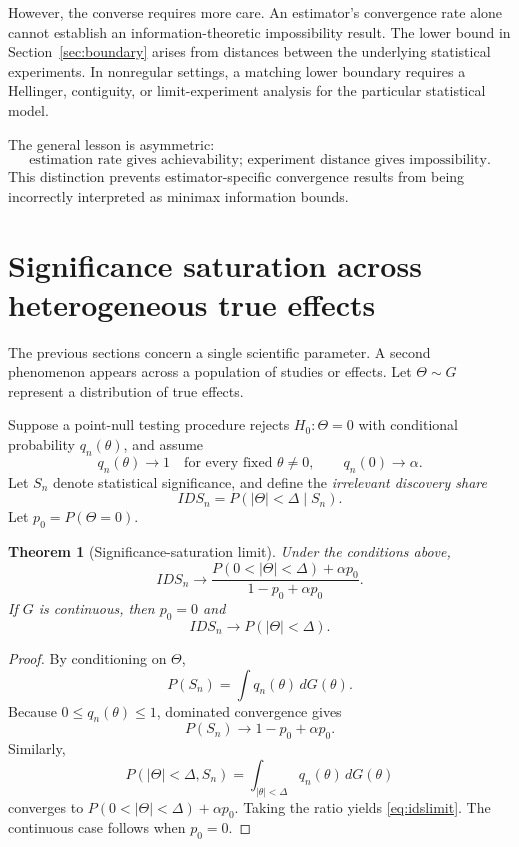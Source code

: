 \documentclass[11pt]{article}
\newtheorem{theorem}{Theorem}
\theoremstyle{remark}
\begin{document}
However, the converse requires more care. An estimator's convergence rate alone cannot establish an information-theoretic impossibility result. The lower bound in Section~\ref{sec:boundary} arises from distances between the underlying statistical experiments. In nonregular settings, a matching lower boundary requires a Hellinger, contiguity, or limit-experiment analysis for the particular statistical model.

The general lesson is asymmetric:
\[
\text{estimation rate gives achievability; experiment distance gives impossibility.}
\]
This distinction prevents estimator-specific convergence results from being incorrectly interpreted as minimax information bounds.

\section{Significance saturation across heterogeneous true effects}

The previous sections concern a single scientific parameter. A second phenomenon appears across a population of studies or effects. Let $\Theta\sim G$ represent a distribution of true effects.

Suppose a point-null testing procedure rejects $H_0:\Theta=0$ with conditional probability $q_n(\theta)$, and assume
\[
q_n(\theta)\to1\quad\text{for every fixed }\theta\ne0,
\qquad
q_n(0)\to\alpha.
\]
Let $S_n$ denote statistical significance, and define the \emph{irrelevant discovery share}
\begin{equation}
IDS_n=P(|\Theta|<\Delta\mid S_n).
\label{eq:ids}
\end{equation}
Let $p_0=P(\Theta=0)$.

\begin{theorem}[Significance-saturation limit]
\label{thm:ids}
Under the conditions above,
\begin{equation}
IDS_n\longrightarrow
\frac{P(0<|\Theta|<\Delta)+\alpha p_0}
{1-p_0+\alpha p_0}.
\label{eq:idslimit}
\end{equation}
If $G$ is continuous, then $p_0=0$ and
\[
IDS_n\longrightarrow P(|\Theta|<\Delta).
\]
\end{theorem}

\begin{proof}
By conditioning on $\Theta$,
\[
P(S_n)=\int q_n(\theta)\,dG(\theta).
\]
Because $0\le q_n(\theta)\le1$, dominated convergence gives
\[
P(S_n)\to1-p_0+\alpha p_0.
\]
Similarly,
\[
P(|\Theta|<\Delta,S_n)
=
\int_{|\theta|<\Delta}q_n(\theta)\,dG(\theta)
\]
converges to $P(0<|\Theta|<\Delta)+\alpha p_0$. Taking the ratio yields \eqref{eq:idslimit}. The continuous case follows when $p_0=0$.
\end{proof}
\end{document}
